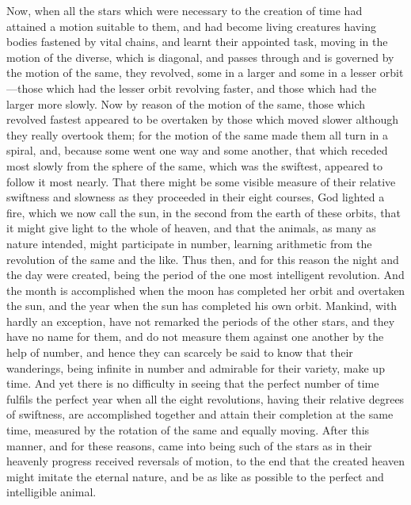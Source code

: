 Now, when all the stars which were necessary to the creation of time had
attained a motion suitable to them, and had become living creatures having
bodies fastened by vital chains, and learnt their appointed task, moving
in the motion of the diverse, which is diagonal, and passes through and is
governed by the motion of the same, they revolved, some in a larger and
some in a lesser orbit—those which had the lesser orbit revolving
faster, and those which had the larger more slowly. Now by reason of the
motion of the same, those which revolved fastest appeared to be overtaken
by those which moved slower although they really overtook them; for the
motion of the same made them all turn in a spiral, and, because some went
one way and some another, that which receded most slowly from the sphere
of the same, which was the swiftest, appeared to follow it most nearly.
That there might be some visible measure of their relative swiftness and
slowness as they proceeded in their eight courses, God lighted a fire,
which we now call the sun, in the second from the earth of these orbits,
that it might give light to the whole of heaven, and that the animals, as
many as nature intended, might participate in number, learning arithmetic
from the revolution of the same and the like. Thus then, and for this
reason the night and the day were created, being the period of the one
most intelligent revolution. And the month is accomplished when the moon
has completed her orbit and overtaken the sun, and the year when the sun
has completed his own orbit. Mankind, with hardly an exception, have not
remarked the periods of the other stars, and they have no name for them,
and do not measure them against one another by the help of number, and
hence they can scarcely be said to know that their wanderings, being
infinite in number and admirable for their variety, make up time. And yet
there is no difficulty in seeing that the perfect number of time fulfils
the perfect year when all the eight revolutions, having their relative
degrees of swiftness, are accomplished together and attain their
completion at the same time, measured by the rotation of the same and
equally moving. After this manner, and for these reasons, came into being
such of the stars as in their heavenly progress received reversals of
motion, to the end that the created heaven might imitate the eternal
nature, and be as like as possible to the perfect and intelligible animal.

